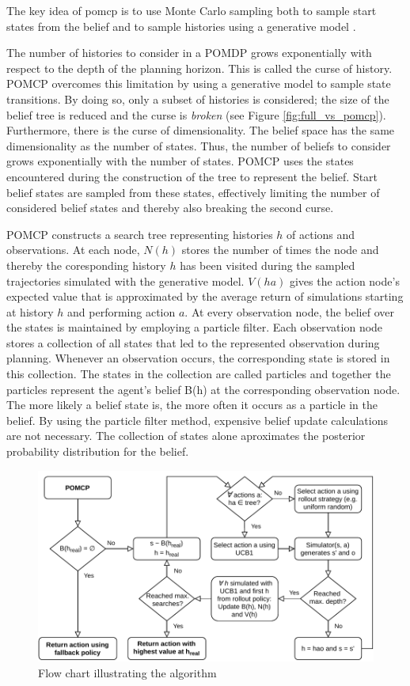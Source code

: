 The key idea of \Gls{pomcp} is to use Monte Carlo sampling both to sample start states from the belief and to sample histories using a generative model \parencite{pomcp}. 

The number of histories to consider in a POMDP grows exponentially with respect to the depth of the planning horizon. This is called the curse of history. POMCP overcomes this limitation by using a generative model to sample state transitions. By doing so, only a subset of histories is considered; the size of the belief tree is reduced and the curse is \textit{broken} (see Figure \ref{fig:full_vs_pomcp}). Furthermore, there is the curse of dimensionality. The belief space has the same dimensionality as the number of states. Thus, the number of beliefs to consider grows exponentially with the number of states. POMCP uses the states encountered during the construction of the tree to represent the belief. Start belief states are sampled from these states, effectively limiting the number of considered belief states and thereby also breaking the second curse. 

POMCP constructs a search tree representing histories $h$ of actions and observations. At each node, $N(h)$ stores the number of times the node and thereby the coresponding history $h$ has been visited during the sampled trajectories simulated with the generative model. $V(ha)$ gives the action node's expected value that is approximated by the average return of simulations starting at history $h$ and performing action $a$. At every observation node, the belief over the states is maintained by employing a particle filter. Each observation node stores a collection of all states that led to the represented observation during planning. Whenever an observation occurs, the corresponding state is stored in this collection. The states in the collection are called particles and together the particles represent the agent's belief B(h) at the corresponding observation node. The more likely a belief state is, the more often it occurs as a particle in the belief. By using the particle filter method, expensive belief update calculations are not necessary. The collection of states alone aproximates the posterior probability distribution for the belief.

\begin{figure}[htbp]
    \centerfloat
    \includegraphics[width=1.0\textwidth]{figures/POMCP.pdf}
    \caption{Flow chart illustrating the  algorithm}
    \label{fig:pomcp}
\end{figure}

